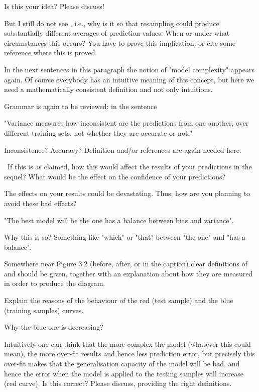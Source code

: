 \begin{description}[style=unboxed,leftmargin=0cm,itemsep=3ex]
Is this your idea? Please discuss!

But I still do not see , i.e., why is it so
that resampling could produce substantially different averages of
prediction values.
When or under what circumstances this occurs?
You have to prove this implication, or cite some reference where this
is proved.


In the next sentences in this paragraph the notion of "model complexity"
appears again.
Of course everybody has an intuitive meaning of this concept, but here
we need a mathematically consistent definition and not only intuitions.

Grammar is again to be reviewed: in the sentence 

"Variance measures how inconsistent are the predictions from one another,
over different training sets, not whether they are accurate or not."

Inconsistence? Accuracy? Definition and/or references are again needed here.
 
\ 
If this is as claimed, how this would affect the results of your predictions
in the sequel? 
What would be the effect on the confidence of your predictions?

The effects on your results could be devastating.
Thus, how are you planning to avoid these bad effects?

"The best model will be the one has a balance between bias and variance".

Why this is so? 
Something like "which" or "that" between "the one" and "has a balance".


Somewhere near Figure 3.2 (before, after, or in the caption) clear
definitions of \red{Prediction error} and \red{Model complexity}
should be given, together with an explanation about how they are
measured in order to produce the diagram.

Explain the reasons of the behaviour of the red (test sample) and the
blue (training samples) curves. 

Why the blue one is decreasing? 

Intuitively one can think that the more complex the model (whatever
this could mean), the more over-fit results and hence less prediction
error, but precisely this over-fit makes that the generalisation
capacity of the model will be bad, and hence the error when the model
is applied to the testing samples will increase (red curve). 
Is this correct?
Please discuss, providing the right definitions.



\end{description}
